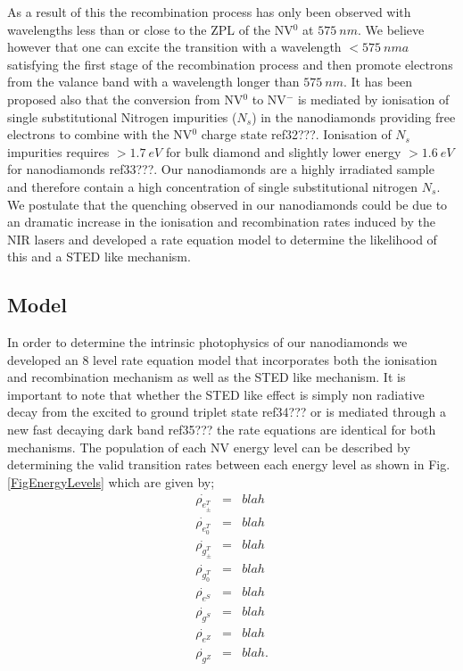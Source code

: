 \documentclass[preprint,prl]{revtex4}
\begin{document}
As a result of this the recombination process has only been observed with wavelengths less than or close to the ZPL of the NV$^0$ at $\SI{575}{nm}$. We believe however that one can excite the transition with a wavelength $<\SI{575}{nm}a$ satisfying the first stage of the recombination process and then promote electrons from the valance band with a wavelength longer than $\SI{575}{nm}$. It has been proposed also that the conversion from NV$^0$ to NV$^-$ is mediated by ionisation of single substitutional Nitrogen impurities ($N_s$) in the nanodiamonds providing free electrons to combine with the NV$^0$ charge state ref32???. Ionisation of $N_s$ impurities requires $>\SI{1.7}{eV}$ for bulk diamond and slightly lower energy $>\SI{1.6}{eV}$ for nanodiamonds ref33???. Our nanodiamonds are a highly irradiated sample and therefore contain a high concentration of single substitutional nitrogen $N_s$. We postulate that the quenching observed in our nanodiamonds could be due to an dramatic increase in the ionisation and recombination rates induced by the NIR lasers and developed a rate equation model to determine the likelihood of this and a STED like mechanism.

\subsection{Model}
In order to determine the intrinsic photophysics of our nanodiamonds we developed an 8 level rate equation model that incorporates both the ionisation and recombination mechanism as well as the STED like mechanism. It is important to note that whether the STED like effect is simply non radiative decay from the excited to ground triplet state ref34??? or is mediated through a new fast decaying dark band ref35??? the rate equations are identical for both mechanisms. The population of each NV energy level can be described by determining the valid transition rates between each energy level as shown in Fig. \ref{FigEnergyLevels} which are given by;
\begin{eqnarray}
\dot{\rho_{e^{T}_\pm}} & = & blah\\ 
\dot{\rho_{e^{T}_0}} & = & blah\\
\dot{\rho_{g^{T}_\pm}} & = & blah\\ 
\dot{\rho_{g^{T}_0}} & = & blah\\
\dot{\rho_{e^S}} & = & blah\\ 
\dot{\rho_{g^S}} & = & blah\\ 
\dot{\rho_{e^Z}} & = & blah\\ 
\dot{\rho_{g^Z}} & = & blah.
\label{EqnArray}
\end{eqnarray}
\end{document}
